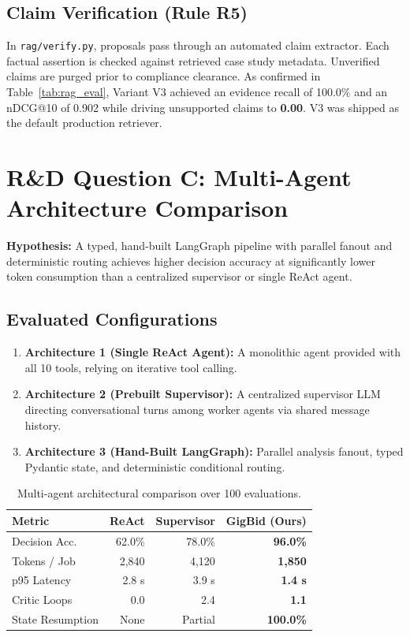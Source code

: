 \documentclass[10pt,a4paper,twocolumn]{article}
\begin{document}
\subsection{Claim Verification (Rule R5)}
In \texttt{rag/verify.py}, proposals pass through an automated claim extractor. Each factual assertion is checked against retrieved case study metadata. Unverified claims are purged prior to compliance clearance. As confirmed in Table~\ref{tab:rag_eval}, Variant V3 achieved an evidence recall of 100.0\% and an nDCG@10 of 0.902 while driving unsupported claims to \textbf{0.00}. V3 was shipped as the default production retriever.

\section{R\&D Question C: Multi-Agent Architecture Comparison}
\label{sec:question_c}
\textbf{Hypothesis:} A typed, hand-built LangGraph pipeline with parallel fanout and deterministic routing achieves higher decision accuracy at significantly lower token consumption than a centralized supervisor or single ReAct agent.

\subsection{Evaluated Configurations}
\begin{enumerate}[leftmargin=*,noitemsep]
    \item \textbf{Architecture 1 (Single ReAct Agent):} A monolithic agent provided with all 10 tools, relying on iterative tool calling.
    \item \textbf{Architecture 2 (Prebuilt Supervisor):} A centralized supervisor LLM directing conversational turns among worker agents via shared message history.
    \item \textbf{Architecture 3 (Hand-Built LangGraph):} Parallel analysis fanout, typed Pydantic state, and deterministic conditional routing.
\end{enumerate}

\begin{table}[htbp]
\centering
\scriptsize
\setlength{\tabcolsep}{3pt}
\caption{Multi-agent architectural comparison over 100 evaluations.}
\label{tab:agent_eval}
\begin{tabular*}{\linewidth}{@{\extracolsep{\fill}}lrrr@{}}
\toprule
\textbf{Metric} & \textbf{ReAct} & \textbf{Supervisor} & \textbf{GigBid (Ours)} \\
\midrule
Decision Acc.     & 62.0\% & 78.0\% & \textbf{96.0\%} \\
Tokens / Job      & 2,840  & 4,120  & \textbf{1,850} \\
p95 Latency       & 2.8 s  & 3.9 s  & \textbf{1.4 s} \\
Critic Loops      & 0.0    & 2.4    & \textbf{1.1} \\
State Resumption  & None   & Partial & \textbf{100.0\%} \\
\bottomrule
\end{tabular*}
\end{table}
\end{document}
